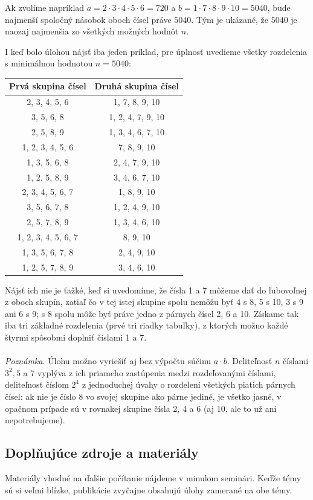 \documentclass[11pt,a4paper,oneside,final]{book}
\begin{document}
Ak zvolíme napríklad $a = 2 \cdot 3 \cdot 4 \cdot 5 \cdot 6 = 720$ a $b = 1 \cdot 7 \cdot 8 \cdot 9 \cdot 10 = 5040$, bude najmenší spoločný násobok oboch čísel práve $5040$. Tým je ukázané, že $5040$ je naozaj najmenšia zo všetkých možných hodnôt $n$.

I keď bolo úlohou nájsť iba jeden príklad, pre úplnosť uvedieme všetky rozdelenia s minimálnou hodnotou $n = 5040$:
\begin{center}
\begin{tabular}{c c}
\hline
Prvá skupina čísel & Druhá skupina čísel \\
\hline
2, 3, 4, 5, 6 &1, 7, 8, 9, 10\\
3, 5, 6, 8 & 1, 2, 4, 7, 9, 10\\
2, 5, 8, 9 & 1, 3, 4, 6, 7, 10\\
1, 2, 3, 4, 5, 6 & 7, 8, 9, 10\\
1, 3, 5, 6, 8 & 2, 4, 7, 9, 10\\
1, 2, 5, 8, 9 & 3, 4, 6, 7, 10\\
2, 3, 4, 5, 6, 7 & 1, 8, 9, 10\\
3, 5, 6, 7, 8 & 1, 2, 4, 9, 10\\
2, 5, 7, 8, 9 & 1, 3, 4, 6, 10\\
1, 2, 3, 4, 5, 6, 7 & 8, 9, 10\\
1, 3, 5, 6, 7, 8 & 2, 4, 9, 10\\
1, 2, 5, 7, 8, 9 & 3, 4, 6, 10
\end{tabular}
\end{center}

Nájsť ich nie je ťažké, keď si uvedomíme, že čísla 1 a 7 môžeme dať do ľubovoľnej z oboch skupín, zatiaľ čo v tej istej skupine spolu nemôžu byť 4 s 8, 5 s 10, 3 s 9 ani 6 s 9; s 8 spolu môže byť práve jedno z párnych čísel 2, 6 a 10. Získame tak iba tri základné rozdelenia (prvé tri riadky tabuľky), z ktorých možno každé štyrmi spôsobmi doplniť číslami 1 a 7.\\
\\
\textit{Poznámka}. Úlohu možno vyriešiť aj bez výpočtu súčinu $a \cdot b$. Deliteľnosť $n$ číslami $3^2, 5$ a 7 vyplýva z ich priameho zastúpenia medzi rozdeľovanými číslami, deliteľnosť číslom $2^4$ z jednoduchej úvahy o rozdelení všetkých piatich párnych čísel: ak nie je číslo 8 vo svojej skupine ako párne jediné, je všetko jasné, v opačnom prípade sú v rovnakej skupine čísla 2, 4 a 6 (aj 10, ale to už ani nepotrebujeme).\\
\subsection*{Doplňujúce zdroje a materiály}
Materiály vhodné na ďalšie počítanie nájdeme v minulom seminári. Keďže témy sú si veľmi blízke, publikácie zvyčajne obsahujú úlohy zamerané na obe témy.
\end{document}
